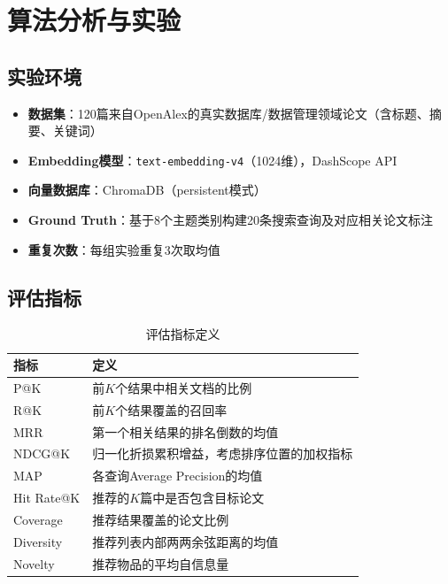 \documentclass[12pt,a4paper]{ctexart}
\newcommand{\code}[1]{\texttt{#1}}
\begin{document}
\section{算法分析与实验}

\subsection{实验环境}

\begin{itemize}
\item \textbf{数据集}：120篇来自OpenAlex的真实数据库/数据管理领域论文（含标题、摘要、关键词）
\item \textbf{Embedding模型}：\code{text-embedding-v4}（1024维），DashScope API
\item \textbf{向量数据库}：ChromaDB（persistent模式）
\item \textbf{Ground Truth}：基于8个主题类别构建20条搜索查询及对应相关论文标注
\item \textbf{重复次数}：每组实验重复3次取均值
\end{itemize}

\subsection{评估指标}

\begin{table}[H]
\centering
\caption{评估指标定义}
\begin{tabular}{lp{10cm}}
\toprule
\textbf{指标} & \textbf{定义} \\
\midrule
P@K      & 前$K$个结果中相关文档的比例 \\
R@K      & 前$K$个结果覆盖的召回率 \\
MRR      & 第一个相关结果的排名倒数的均值 \\
NDCG@K   & 归一化折损累积增益，考虑排序位置的加权指标 \\
MAP      & 各查询Average Precision的均值 \\
Hit Rate@K & 推荐的$K$篇中是否包含目标论文 \\
Coverage & 推荐结果覆盖的论文比例 \\
Diversity & 推荐列表内部两两余弦距离的均值 \\
Novelty  & 推荐物品的平均自信息量 \\
\bottomrule
\end{tabular}
\end{table}
\end{document}

